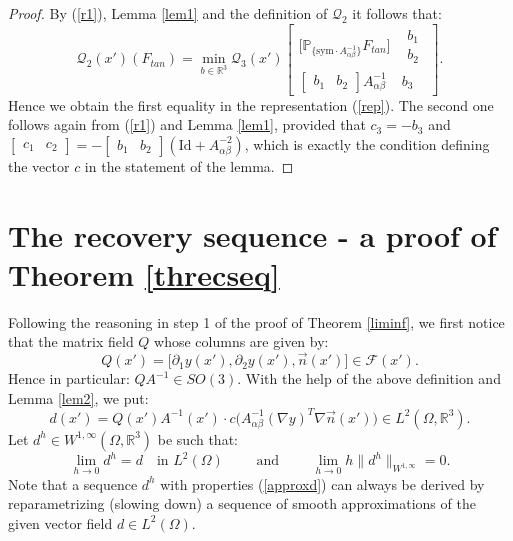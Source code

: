 \documentclass[leqno,twoside, 11pt]{amsart}
\theoremstyle{plain}
\theoremstyle{definition}
\numberwithin{equation}{section}
\numberwithin{figure}{section}
\begin{document}
\begin{proof}
By (\ref{r1}), Lemma \ref{lem1} and the definition of $\mathcal{Q}_2$ 
it follows that:
$$\mathcal{Q}_2(x')(F_{tan}) = \min_{b\in\mathbb{R}^3}
\mathcal{Q}_3(x')\left[\begin{array}{cc} 
\Big[\mathbb{P}_{\{\mathrm{sym}\cdot A_{\alpha\beta}^{-1}\}} F_{tan}\Big]
& \begin{array}{c} b_{1}\\ b_{2}\end{array}\\
\left[\begin{array}{cc} b_{1} &  b_{2} \end{array}\right] A_{\alpha\beta}^{-1}
& b_{3} \end{array}\right].$$
Hence we obtain the first equality in the representation (\ref{rep}).
The second one follows again from (\ref{r1}) and Lemma \ref{lem1}, provided that
$c_{3} = -b_{3}$ and
$\left[\begin{array}{cc}c_{1}& c_{2}\end{array}\right]
= - \left[\begin{array}{cc}b_{1}& b_{2}\end{array}\right] 
\left(\mathrm{Id} + A_{\alpha\beta}^{-2}\right)$,
which is exactly the condition defining the vector $c$
in the statement of the lemma.
\end{proof}

\section{The recovery sequence - a proof of Theorem \ref{threcseq}}

Following the reasoning in step 1 of the proof of Theorem \ref{liminf}, 
we first notice that the matrix field $Q$ whose columns are given by:
$$Q(x') = \Big[\partial_1 y(x'), \partial_2 y(x'), \vec n(x')\Big]
\in \mathcal{F}(x').$$
Hence in particular: $QA^{-1}\in SO(3)$.
With the help of the above definition and Lemma \ref{lem2}, we put:  
\begin{equation}\label{ddef}
d(x') = Q(x')A^{-1}(x')\cdot c\Big(A_{\alpha\beta}^{-1}(\nabla y)^T
\nabla \vec n(x')\Big)\in L^2(\Omega, \mathbb{R}^3).
\end{equation}
Let $d^h\in W^{1,\infty}(\Omega,\mathbb{R}^3)$ be such that:
\begin{equation}\label{approxd}
\lim_{h\to 0} d^h = d \quad \mbox{in } L^2(\Omega) \qquad
\mbox{ and } \qquad
\lim_{h\to 0} h\| d^h\|_{W^{1,\infty}}  =0.
\end{equation} 
Note that a sequence $d^h$ with properties (\ref{approxd}) can always be 
derived by reparametrizing (slowing down) a sequence of smooth approximations 
of the given vector field $d\in L^2(\Omega)$.
\end{document}
